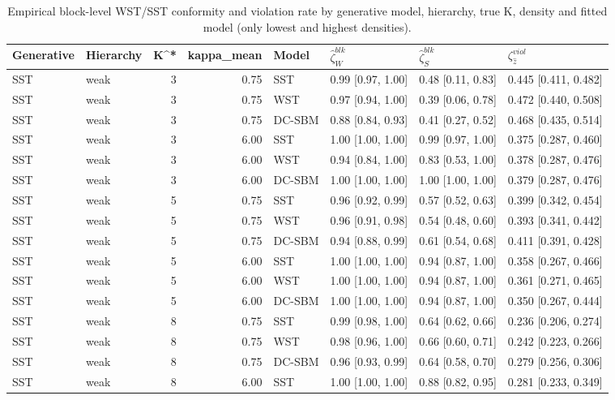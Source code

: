 \begin{table}
\centering
\caption{Empirical block-level WST/SST conformity and violation rate by generative model, hierarchy, true K, density and fitted model (only lowest and highest densities).}
\centering
\begin{tabular}[t]{llrrllll}
\toprule
Generative & Hierarchy & K^* & kappa_mean & Model & $\widehat{\zeta}_W^{blk}$ & $\widehat{\zeta}_S^{blk}$ & $\zeta^{viol}_{\hat z}$\\
\midrule
SST & weak & 3 & 0.75 & SST & 0.99 [0.97, 1.00] & 0.48 [0.11, 0.83] & 0.445 [0.411, 0.482]\\
SST & weak & 3 & 0.75 & WST & 0.97 [0.94, 1.00] & 0.39 [0.06, 0.78] & 0.472 [0.440, 0.508]\\
SST & weak & 3 & 0.75 & DC-SBM & 0.88 [0.84, 0.93] & 0.41 [0.27, 0.52] & 0.468 [0.435, 0.514]\\
SST & weak & 3 & 6.00 & SST & 1.00 [1.00, 1.00] & 0.99 [0.97, 1.00] & 0.375 [0.287, 0.460]\\
SST & weak & 3 & 6.00 & WST & 0.94 [0.84, 1.00] & 0.83 [0.53, 1.00] & 0.378 [0.287, 0.476]\\
\addlinespace
SST & weak & 3 & 6.00 & DC-SBM & 1.00 [1.00, 1.00] & 1.00 [1.00, 1.00] & 0.379 [0.287, 0.476]\\
SST & weak & 5 & 0.75 & SST & 0.96 [0.92, 0.99] & 0.57 [0.52, 0.63] & 0.399 [0.342, 0.454]\\
SST & weak & 5 & 0.75 & WST & 0.96 [0.91, 0.98] & 0.54 [0.48, 0.60] & 0.393 [0.341, 0.442]\\
SST & weak & 5 & 0.75 & DC-SBM & 0.94 [0.88, 0.99] & 0.61 [0.54, 0.68] & 0.411 [0.391, 0.428]\\
SST & weak & 5 & 6.00 & SST & 1.00 [1.00, 1.00] & 0.94 [0.87, 1.00] & 0.358 [0.267, 0.466]\\
\addlinespace
SST & weak & 5 & 6.00 & WST & 1.00 [1.00, 1.00] & 0.94 [0.87, 1.00] & 0.361 [0.271, 0.465]\\
SST & weak & 5 & 6.00 & DC-SBM & 1.00 [1.00, 1.00] & 0.94 [0.87, 1.00] & 0.350 [0.267, 0.444]\\
SST & weak & 8 & 0.75 & SST & 0.99 [0.98, 1.00] & 0.64 [0.62, 0.66] & 0.236 [0.206, 0.274]\\
SST & weak & 8 & 0.75 & WST & 0.98 [0.96, 1.00] & 0.66 [0.60, 0.71] & 0.242 [0.223, 0.266]\\
SST & weak & 8 & 0.75 & DC-SBM & 0.96 [0.93, 0.99] & 0.64 [0.58, 0.70] & 0.279 [0.256, 0.306]\\
\addlinespace
SST & weak & 8 & 6.00 & SST & 1.00 [1.00, 1.00] & 0.88 [0.82, 0.95] & 0.281 [0.233, 0.349]\\

\end{tabular}
\end{table}
